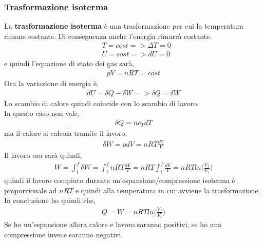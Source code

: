             \subsubsection{Trasformazione isoterma}
                La \textbf{trasformazione isoterma} è una trasformazione per cui la temperatura rimane costante. Di conseguenza anche l'energia rimarrà costante.
                \begin{align*}
                    &T = cost => \Delta T = 0\\
                    &U = cost => dU = 0
                \end{align*}
                e quindi l'equazione di stato dei gas sarà,
                \begin{align*}
                    pV = nRT = cost
                \end{align*}
                Ora la variazione di energia è,
                \begin{align*}
                    dU = \delta Q - \delta W => \delta Q = \delta W
                \end{align*}
                Lo scambio di calore quindi coincide con lo scambio di lavoro.\\
                In questo caso non vale,
                \begin{align*}
                    \delta Q = nc_TdT
                \end{align*}
                ma il calore si calcola tramite il lavoro,
                \begin{align*}
                    \delta W = pdV = nRT\frac{dV}{V}
                \end{align*}
                Il lavoro ora sarà quindi,
                \begin{align*}
                    W=\int_i^f \delta W = \int_i^f nRT\frac{dV}{V} = nRT \int_i^f \frac{dV}{V} = nRTln\bigg(\frac{V_f}{V_i}\bigg)
                \end{align*}
                quindi il lavoro compiuto durante un'espansione/compressione isoterma è proporzionale ad $nRT$ e quindi alla temperatura in cui avviene la trasformazione.\\
                In conclusione ho quindi che,
                \begin{align*}
                    Q = W = nRTln\bigg(\frac{V_f}{V_i}\bigg)
                \end{align*}
                Se ho un'espansione allora calore e lavoro saranno positivi, se ho una compressione invece saranno negativi.

